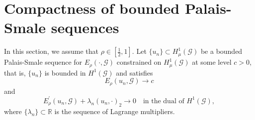 \documentclass[11pt]{amsart}
\newcommand{\G}{\mathcal{G}}
\newcommand{\R}{\mathbb{R}}
\numberwithin{equation}{section}
\begin{document}
\section{Compactness of bounded Palais-Smale sequences}\label{sec3}
In this section, we assume that $\rho \in [\frac{1}{2},1]$. Let $\{u_n\} \subset H_\mu^1(\mathcal{G})$ be a bounded Palais-Smale sequence for $E_\rho(\cdot, \G)$ constrained on $H_\mu^1(\G)$ at some level $c>0$, that is, $\{u_n\}$ is bounded in $H^1(\mathcal{G})$ and satisfies
\begin{equation}\label{PS1}
E_\rho(u_n, \mathcal{G}) \to c 
\end{equation}
and 
\begin{equation}\label{PS2}
E^{ \prime}_{\rho}(u_n, \mathcal{G}) + \lambda_n (u_n, \cdot)_2 \to 0 \quad \text{in the dual of $H^1(\mathcal{G})$},
\end{equation}
where $\{\lambda_n\} \subset \R$ is the sequence of Lagrange multipliers.
\end{document}
